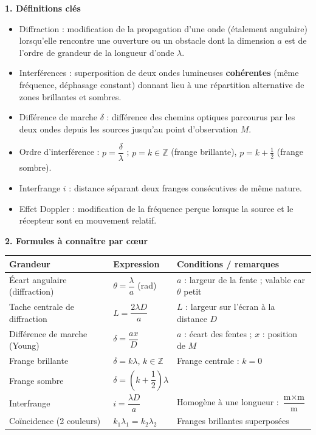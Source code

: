 \documentclass[11pt]{article}
\newcommand{\cle}[1]{{\popxbold\color{popdark}#1}}
\begin{document}
\begin{bilan}
\textbf{1. Définitions clés}
\begin{itemize}
  \item \cle{Diffraction} : modification de la propagation d'une onde (étalement angulaire) lorsqu'elle rencontre une ouverture ou un obstacle dont la dimension $a$ est de l'ordre de grandeur de la longueur d'onde $\lambda$.
  \item \cle{Interférences} : superposition de deux ondes lumineuses \textbf{cohérentes} (même fréquence, déphasage constant) donnant lieu à une répartition alternative de zones brillantes et sombres.
  \item \cle{Différence de marche} $\delta$ : différence des chemins optiques parcourus par les deux ondes depuis les sources jusqu'au point d'observation $M$.
  \item \cle{Ordre d'interférence} : $p = \dfrac{\delta}{\lambda}$ ; $p = k \in \mathbb{Z}$ (frange brillante), $p = k + \tfrac{1}{2}$ (frange sombre).
  \item \cle{Interfrange} $i$ : distance séparant deux franges consécutives de même nature.
  \item \cle{Effet Doppler} : modification de la fréquence perçue lorsque la source et le récepteur sont en mouvement relatif.
\end{itemize}

\textbf{2. Formules à connaître par c\oe ur}
\begin{center}
\begin{tabularx}{\linewidth}{|l|X|X|}
\hline
\rowcolor{popblueL} \textbf{Grandeur} & \textbf{Expression} & \textbf{Conditions / remarques} \\
\hline
Écart angulaire (diffraction) & $\theta = \dfrac{\lambda}{a}$ (rad) & $a$ : largeur de la fente ; valable car $\theta$ petit \\
\hline
Tache centrale de diffraction & $L = \dfrac{2\lambda D}{a}$ & $L$ : largeur sur l'écran à la distance $D$ \\
\hline
Différence de marche (Young) & $\delta = \dfrac{ax}{D}$ & $a$ : écart des fentes ; $x$ : position de $M$ \\
\hline
Frange brillante & $\delta = k\lambda$, $k \in \mathbb{Z}$ & Frange centrale : $k = 0$ \\
\hline
Frange sombre & $\delta = \left(k + \dfrac{1}{2}\right)\lambda$ & \\
\hline
Interfrange & $i = \dfrac{\lambda D}{a}$ & Homogène à une longueur : $\dfrac{\text{m}\times\text{m}}{\text{m}}$ \\
\hline
Coïncidence (2 couleurs) & $k_1\lambda_1 = k_2\lambda_2$ & Franges brillantes superposées \\
\hline
\end{tabularx}
\end{center}


\end{bilan}
\end{document}
